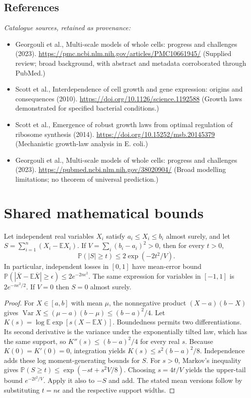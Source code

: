 \documentclass[11pt]{article}
\begin{document}
\subsection{References}
\noindent\emph{Catalogue sources, retained as provenance:}
\begin{itemize}
\item Georgouli et al., Multi-scale models of whole cells: progress and challenges (2023). \url{https://pmc.ncbi.nlm.nih.gov/articles/PMC10661945/} (Supplied review; broad background, with abstract and metadata corroborated through PubMed.)
\item Scott et al., Interdependence of cell growth and gene expression: origins and consequences (2010). \url{https://doi.org/10.1126/science.1192588} (Growth laws demonstrated for specified bacterial conditions.)
\item Scott et al., Emergence of robust growth laws from optimal regulation of ribosome synthesis (2014). \url{https://doi.org/10.15252/msb.20145379} (Mechanistic growth-law analysis in E. coli.)
\item Georgouli et al., Multi-scale models of whole cells: progress and challenges (2023). \url{https://pubmed.ncbi.nlm.nih.gov/38020904/} (Broad modelling limitations; no theorem of universal prediction.)
\end{itemize}




\section{Shared mathematical bounds}\label{app:bounds}
\begin{lemma}\label{lem:bounded}
Let independent real variables $X_i$ satisfy $a_i\leq X_i\leq b_i$ almost surely,
and let $S=\sum_{i=1}^n(X_i-\mathbb{E} X_i)$. If
$V=\sum_i(b_i-a_i)^2>0$, then for every $t>0$,
\[
 \mathbb{P}(|S|\geq t)\leq 2\exp(-2t^2/V).
\]
In particular, independent losses in $[0,1]$ have mean-error bound
$\mathbb{P}(|\overline X-\mathbb{E}\overline X|\geq\epsilon)
\leq2e^{-2n\epsilon^2}$. The same expression for variables in $[-1,1]$
is $2e^{-n\epsilon^2/2}$. If $V=0$ then $S=0$ almost surely.
\end{lemma}
\begin{proof}
For $X\in[a,b]$ with mean $\mu$, the nonnegative product
$(X-a)(b-X)$ gives
$\operatorname{Var} X\leq(\mu-a)(b-\mu)\leq(b-a)^2/4$.
Let $K(s)=\log\mathbb{E}\exp[s(X-\mathbb{E} X)]$.
Boundedness permits two differentiations. Its second derivative is the variance
under the exponentially tilted law, which has the same support, so
$K''(s)\leq(b-a)^2/4$ for every real $s$.
Because $K(0)=K'(0)=0$, integration yields
$K(s)\leq s^2(b-a)^2/8$.
Independence adds these log moment-generating bounds for $S$.
For $s>0$, Markov's inequality gives
$\mathbb{P}(S\geq t)\leq\exp(-st+s^2V/8)$.
Choosing $s=4t/V$ yields the upper-tail bound $e^{-2t^2/V}$.
Apply it also to $-S$ and add. The stated mean versions follow by substituting
$t=n\epsilon$ and the respective support widths.
\end{proof}
\end{document}
